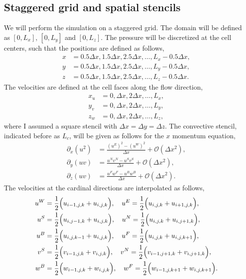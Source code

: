 \documentclass[fleqn,a4paper]{article} %
\numberwithin{equation}{section} %
\numberwithin{figure}{section} %
\numberwithin{algorithm}{section} %
\begin{document}
\subsection{Staggered grid and spatial stencils}
We will perform the simulation on a staggered grid. The domain will be defined as $[0, L_x]$, $[0, L_y]$ and $[0, L_z]$. The pressure will be discretized at the cell centers, such that the positions are defined as follows, 
\begin{equation}
\begin{split}
    x &= 0.5 \Delta x, 1.5 \Delta x, 2.5 \Delta x, \ldots, L_x - 0.5\Delta x,\\
    y &= 0.5 \Delta x, 1.5 \Delta x, 2.5 \Delta x, \ldots, L_y - 0.5\Delta x,\\
    z &= 0.5 \Delta x, 1.5 \Delta x, 2.5 \Delta x, \ldots, L_z - 0.5\Delta x.
\end{split}
\end{equation}
The velocities are defined at the cell faces along the flow direction,
\begin{equation}
\begin{split}
    x_u &= 0, \Delta x, 2\Delta x, \ldots, L_x,\\
    y_v &= 0, \Delta x, 2\Delta x, \ldots, L_y,\\
    z_w &= 0, \Delta x, 2\Delta x, \ldots, L_z,
\end{split}
\end{equation}
where I assumed a square stencil with $\Delta x = \Delta y = \Delta z$. The convective stencil, indicated before as $L_c$, will be given as follows for the $x$ momentum equation,
\begin{equation}
\begin{split}
    \partial_x \left(u^2\right) &= \frac{\left(u^E\right)^2 - \left(u^W\right)^2}{\Delta x} + \mathcal{O}\left(\Delta x^2\right),\\
    \partial_y \left(u v\right)&= \frac{u^N v^N - u^S v^S}{\Delta x} + \mathcal{O}\left(\Delta x^2\right),\\
    \partial_z \left(u v\right)&= \frac{u^F w^F - u^B w^B}{\Delta x} + \mathcal{O}\left(\Delta x^2\right).
\end{split}
\end{equation}
The velocities at the cardinal directions are interpolated as follows,
\begin{equation}
\begin{split}
    u^W &= \frac12 \Bigl(u_{i-1, j, k} + u_{i, j, k}\Bigr), \quad u^E = \frac12 \Bigl(u_{i, j, k} + u_{i+1, j, k}\Bigr),\\
    u^S &= \frac12 \Bigl(u_{i, j-1, k} + u_{i, j, k}\Bigr), \quad u^N = \frac12 \Bigl(u_{i, j, k} + u_{i, j+1, k}\Bigr),\\
    u^B &= \frac12 \Bigl(u_{i, j, k-1} + u_{i, j, k}\Bigr), \quad u^F = \frac12 \Bigl(u_{i, j, k} + u_{i, j, k+1}\Bigr),\\
    v^S &= \frac12 \Bigl(v_{i-1, j, k} + v_{i, j, k}\Bigr), \quad v^N = \frac12 \Bigl(v_{i-1, j+1, k} + v_{i, j+1, k}\Bigr),\\
    w^B &= \frac12 \Bigl(w_{i-1, j, k} + w_{i, j, k}\Bigr), \quad w^F = \frac12 \Bigl(w_{i-1, j, k+1} + w_{i, j, k+1}\Bigr).
\end{split}
\end{equation}
\end{document}
